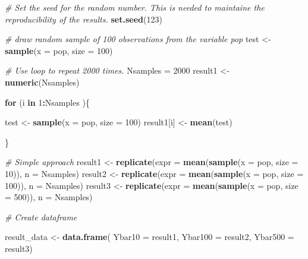 \documentclass[]{book}
\newenvironment{Shaded}{\begin{snugshade}}{\end{snugshade}}
\newcommand{\KeywordTok}[1]{\textcolor[rgb]{0.13,0.29,0.53}{\textbf{#1}}}
\newcommand{\DataTypeTok}[1]{\textcolor[rgb]{0.13,0.29,0.53}{#1}}
\newcommand{\DecValTok}[1]{\textcolor[rgb]{0.00,0.00,0.81}{#1}}
\newcommand{\StringTok}[1]{\textcolor[rgb]{0.31,0.60,0.02}{#1}}
\newcommand{\CommentTok}[1]{\textcolor[rgb]{0.56,0.35,0.01}{\textit{#1}}}
\newcommand{\ControlFlowTok}[1]{\textcolor[rgb]{0.13,0.29,0.53}{\textbf{#1}}}
\newcommand{\OperatorTok}[1]{\textcolor[rgb]{0.81,0.36,0.00}{\textbf{#1}}}
\newcommand{\NormalTok}[1]{#1}
\begin{document}
\begin{Shaded}
\begin{Highlighting}[]
\CommentTok{# Set the seed for the random number. This is needed to maintaine the reproducibility of the results.}
\KeywordTok{set.seed}\NormalTok{(}\DecValTok{123}\NormalTok{)}

\CommentTok{# draw random sample of 100 observations from the variable pop}
\NormalTok{test <-}\StringTok{ }\KeywordTok{sample}\NormalTok{(}\DataTypeTok{x =}\NormalTok{ pop, }\DataTypeTok{size =} \DecValTok{100}\NormalTok{)}

\CommentTok{# Use loop to repeat 2000 times. }
\NormalTok{Nsamples =}\StringTok{ }\DecValTok{2000}
\NormalTok{result1 <-}\StringTok{ }\KeywordTok{numeric}\NormalTok{(Nsamples)}

\ControlFlowTok{for}\NormalTok{ (i }\ControlFlowTok{in} \DecValTok{1}\OperatorTok{:}\NormalTok{Nsamples )\{}
  
\NormalTok{  test <-}\StringTok{ }\KeywordTok{sample}\NormalTok{(}\DataTypeTok{x =}\NormalTok{ pop, }\DataTypeTok{size =} \DecValTok{100}\NormalTok{)}
\NormalTok{  result1[i] <-}\StringTok{ }\KeywordTok{mean}\NormalTok{(test)}
  
\NormalTok{\}}

\CommentTok{# Simple approach}
\NormalTok{result1 <-}\StringTok{ }\KeywordTok{replicate}\NormalTok{(}\DataTypeTok{expr =} \KeywordTok{mean}\NormalTok{(}\KeywordTok{sample}\NormalTok{(}\DataTypeTok{x =}\NormalTok{ pop, }\DataTypeTok{size =} \DecValTok{10}\NormalTok{)), }\DataTypeTok{n =}\NormalTok{ Nsamples)}
\NormalTok{result2 <-}\StringTok{ }\KeywordTok{replicate}\NormalTok{(}\DataTypeTok{expr =} \KeywordTok{mean}\NormalTok{(}\KeywordTok{sample}\NormalTok{(}\DataTypeTok{x =}\NormalTok{ pop, }\DataTypeTok{size =} \DecValTok{100}\NormalTok{)), }\DataTypeTok{n =}\NormalTok{ Nsamples)}
\NormalTok{result3 <-}\StringTok{ }\KeywordTok{replicate}\NormalTok{(}\DataTypeTok{expr =} \KeywordTok{mean}\NormalTok{(}\KeywordTok{sample}\NormalTok{(}\DataTypeTok{x =}\NormalTok{ pop, }\DataTypeTok{size =} \DecValTok{500}\NormalTok{)), }\DataTypeTok{n =}\NormalTok{ Nsamples)}

\CommentTok{# Create dataframe}

\NormalTok{result_data <-}\StringTok{ }\KeywordTok{data.frame}\NormalTok{(  }\DataTypeTok{Ybar10 =}\NormalTok{ result1, }
                            \DataTypeTok{Ybar100 =}\NormalTok{ result2, }
                            \DataTypeTok{Ybar500 =}\NormalTok{ result3)}
\end{Highlighting}
\end{Shaded}
\end{document}
